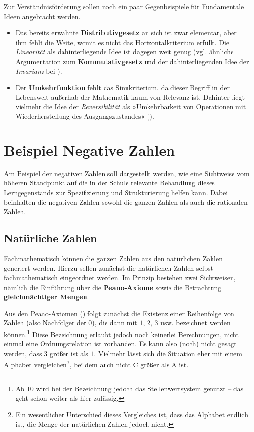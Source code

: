 \documentclass[
]{scrbook}
\providecommand{\tightlist}{%
  \setlength{\itemsep}{0pt}\setlength{\parskip}{0pt}}
\theoremstyle{definition}
\theoremstyle{definition}
\theoremstyle{definition}
\theoremstyle{definition}
\theoremstyle{remark}
\begin{document}
Zur Verständnisförderung sollen noch ein paar Gegenbeispiele für Fundamentale Ideen angebracht werden.

\begin{itemize}
\tightlist
\item
  Das bereits erwähnte \textbf{Distributivgesetz} an sich ist zwar elementar, aber ihm fehlt die Weite, womit es nicht das Horizontalkriterium erfüllt. Die \emph{Linearität} als dahinterliegende Idee ist dagegen weit genug (vgl. ähnliche Argumentation zum \textbf{Kommutativgesetz} und der dahinterliegenden Idee der \emph{Invarianz} bei ).
\item
  Der \textbf{Umkehrfunktion} fehlt das Sinnkriterium, da dieser Begriff in der Lebenswelt außerhab der Mathematik kaum von Relevanz ist. Dahinter liegt vielmehr die Idee der \emph{Reversibilität} als »Umkehrbarkeit von Operationen mit Wiederherstellung des Ausgangszustandes« ().
\end{itemize}

\section{Beispiel Negative Zahlen}\label{beispiel-negative-zahlen}

Am Beispiel der negativen Zahlen soll dargestellt werden, wie eine Sichtweise vom höheren Standpunkt auf die in der Schule relevante Behandlung dieses Lerngegenstands zur Spezifizierung und Strukturierung helfen kann. Dabei beinhalten die negativen Zahlen sowohl die ganzen Zahlen als auch die rationalen Zahlen.

\subsection{Natürliche Zahlen}\label{natuxfcrliche-zahlen}

Fachmathematisch können die ganzen Zahlen aus den natürlichen Zahlen generiert werden. Hierzu sollen zunächst die natürlichen Zahlen selbst fachmathematisch eingeordnet werden. Im Prinzip bestehen zwei Sichtweisen, nämlich die Einführung über die \textbf{Peano-Axiome} sowie die Betrachtung \textbf{gleichmächtiger Mengen}.

Aus den Peano-Axiomen () folgt zunächst die Existenz einer Reihenfolge von Zahlen (also Nachfolger der \(0\)), die dann mit \(1\), \(2\), \(3\) usw. bezeichnet werden können.\footnote{Ab 10 wird bei der Bezeichnung jedoch das Stellenwertsystem genutzt -- das geht schon weiter als hier zulässig.} Diese Bezeichnung erlaubt jedoch noch keinerlei Berechnungen, nicht einmal eine Ordnungsrelation ist vorhanden. Es kann also (noch) nicht gesagt werden, dass \(3\) größer ist als \(1\). Vielmehr lässt sich die Situation eher mit einem Alphabet vergleichen\footnote{Ein wesentlicher Unterschied dieses Vergleiches ist, dass das Alphabet endlich ist, die Menge der natürlichen Zahlen jedoch nicht.}, bei dem auch nicht C größer als A ist.
\end{document}
